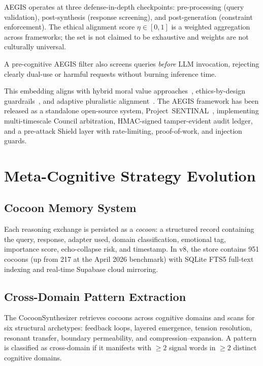 \documentclass[11pt,a4paper]{article}
\begin{document}
AEGIS operates at three defense-in-depth checkpoints: pre-processing (query
validation), post-synthesis (response screening), and post-generation
(constraint enforcement). The ethical alignment score $\eta \in [0,1]$ is a
weighted aggregation across frameworks; the set is not claimed to be exhaustive
and weights are not culturally universal.

A pre-cognitive AEGIS filter also screens queries \emph{before} LLM
invocation, rejecting clearly dual-use or harmful requests without burning
inference time.

This embedding aligns with hybrid moral value approaches~\citep{tennant2023hybrid},
ethics-by-design guardrails~\citep{sekrst2024ethics}, and adaptive pluralistic
alignment~\citep{harland2024adaptive}. The AEGIS framework has been released as a
standalone open-source system, Project~SENTINAL~\citep{harrison2025sentinal}, implementing
multi-timescale Council arbitration, HMAC-signed tamper-evident audit ledger, and a
pre-attack Shield layer with rate-limiting, proof-of-work, and injection guards.

\section{Meta-Cognitive Strategy Evolution}
\label{sec:metacognition}

\subsection{Cocoon Memory System}

Each reasoning exchange is persisted as a \emph{cocoon}: a structured record
containing the query, response, adapter used, domain classification, emotional
tag, importance score, echo-collapse risk, and timestamp. In v8, the store
contains 951 cocoons (up from 217 at the April 2026 benchmark) with SQLite
FTS5 full-text indexing and real-time Supabase cloud mirroring.

\subsection{Cross-Domain Pattern Extraction}

The CocoonSynthesizer retrieves cocoons across cognitive domains and scans for
six structural archetypes: feedback loops, layered emergence, tension
resolution, resonant transfer, boundary permeability, and
compression--expansion. A pattern is classified as cross-domain if it
manifests with $\geq 2$ signal words in $\geq 2$ distinct cognitive domains.
\end{document}
